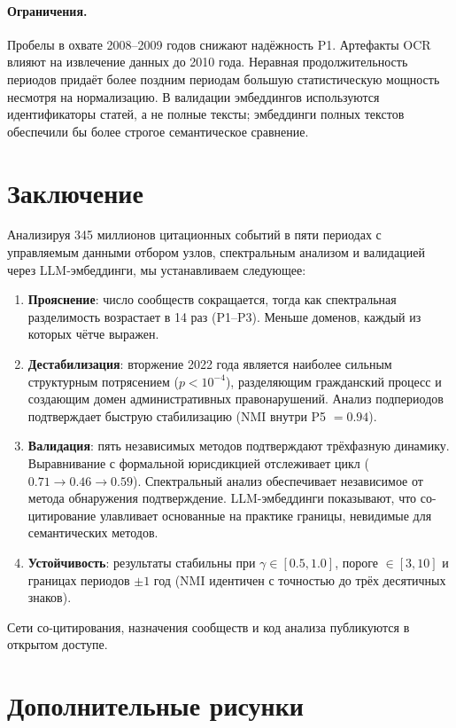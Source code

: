 \documentclass[11pt]{article}
\begin{document}
\paragraph{Ограничения.}
Пробелы в охвате 2008--2009 годов снижают надёжность P1.
Артефакты OCR влияют на извлечение данных до 2010 года.
Неравная продолжительность периодов придаёт более поздним периодам большую статистическую мощность несмотря на нормализацию.
В валидации эмбеддингов используются идентификаторы статей, а не полные тексты; эмбеддинги полных текстов обеспечили бы более строгое семантическое сравнение.

\section{Заключение}
\label{sec:conclusion}

Анализируя 345 миллионов цитационных событий в пяти периодах с управляемым данными отбором узлов, спектральным анализом и валидацией через LLM-эмбеддинги, мы устанавливаем следующее:

\begin{enumerate}[nosep]
  \item \textbf{Прояснение}: число сообществ сокращается, тогда как спектральная разделимость возрастает в 14 раз (P1--P3). Меньше доменов, каждый из которых чётче выражен.
  \item \textbf{Дестабилизация}: вторжение 2022 года является наиболее сильным структурным потрясением ($p < 10^{-4}$), разделяющим гражданский процесс и создающим домен административных правонарушений. Анализ подпериодов подтверждает быструю стабилизацию (NMI внутри P5 $= 0.94$).
  \item \textbf{Валидация}: пять независимых методов подтверждают трёхфазную динамику. Выравнивание с формальной юрисдикцией отслеживает цикл ($0.71 \to 0.46 \to 0.59$). Спектральный анализ обеспечивает независимое от метода обнаружения подтверждение. LLM-эмбеддинги показывают, что со-цитирование улавливает основанные на практике границы, невидимые для семантических методов.
  \item \textbf{Устойчивость}: результаты стабильны при $\gamma \in [0.5, 1.0]$, пороге $\in [3, 10]$ и границах периодов $\pm 1$ год (NMI идентичен с точностью до трёх десятичных знаков).
\end{enumerate}

Сети со-цитирования, назначения сообществ и код анализа публикуются в открытом доступе.

\appendix
\section{Дополнительные рисунки}
\end{document}
